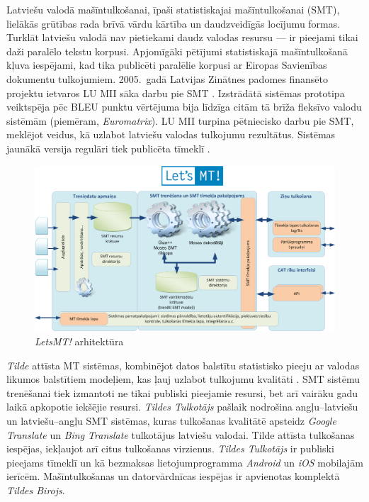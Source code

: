 \begin{multicols}{2}
Latviešu valodā mašīntulkošanai, īpaši statistiskajai mašīntulkošanai (SMT), lielākās grūtības rada brīvā vārdu kārtība un daudzveidīgās locījumu formas. 
Turklāt latviešu valodā nav pietiekami daudz valodas resursu — ir pieejami tikai daži paralēlo tekstu korpusi. 
Apjomīgāki pētījumi statistiskajā mašīntulkošanā kļuva iespējami, kad tika publicēti paralēlie korpusi ar Eiropas Savienības dokumentu tulkojumiem.
2005.~gadā Latvijas Zinātnes padomes finansēto projektu ietvaros LU MII sāka darbu pie SMT \cite{Meta25, Meta26}.
Izstrādātā sistēmas prototipa veiktspēja pēc BLEU punktu vērtējuma bija līdzīga citām tā brīža fleksīvo valodu sistēmām (piemēram, \textit{Euromatrix}). 
LU MII turpina pētniecisko darbu pie SMT, meklējot veidus, kā uzlabot latviešu valodas tulkojumu rezultātus. 
Sistēmas jaunākā versija regulāri tiek publicēta tīmeklī \cite{Meta27}.

\begin{figure}[htb]
  \center
  \includegraphics[width=\textwidth]{../_media/latvian/LetsMT_architecture_LV}
  \caption{\textit{LetsMT!} arhitektūra}
  \label{fig:LetsMT_architecture_LV}
\end{figure}

\textit{Tilde} attīsta MT sistēmas, kombinējot datos balstītu statistisko pieeju ar valodas likumos balstītiem modeļiem, kas ļauj uzlabot tulkojumu kvalitāti \cite{Meta29}.
SMT sistēmu trenēšanai tiek izmantoti ne tikai publiski pieejamie resursi, bet arī vairāku gadu laikā apkopotie iekšējie resursi.
\textit{Tildes Tulkotājs} pašlaik nodrošina angļu--latviešu un latviešu--angļu SMT sistēmas, kuras tulkošanas kvalitātē apsteidz \textit{Google Translate} un \textit{Bing Translate} tulkotājus latviešu valodai. 
Tilde attīsta tulkošanas iespējas, iekļaujot arī citus tulkošanas virzienus.
\textit{Tildes Tulkotājs} ir publiski pieejams tīmeklī \cite{Meta28} un kā bezmaksas lietojumprogramma \textit{Android} un \textit{iOS} mobilajām ierīcēm. 
Mašīntulkošanas un datorvārdnīcas iespējas ir apvienotas komplektā \textit{Tildes Birojs}.


\end{multicols}
